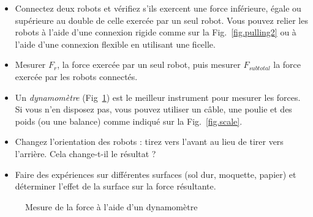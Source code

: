 \begin{framed}
\begin{itemize}
\item Connectez deux robots et vérifiez s'ils exercent une force inférieure, égale ou supérieure au double de celle exercée par un seul robot. Vous pouvez relier les robots à l'aide d'une connexion rigide comme sur la Fig.~\ref{fig.pulling2} ou à l'aide d'une connexion flexible en utilisant une ficelle.
\item Mesurer $F_r$, la force exercée par un seul robot, puis mesurer $F_{sub{total}}$ la force exercée par les robots connectés.
\item Un \emph{dynamomètre} (Fig~\ref{fig.dyna}) est le meilleur instrument pour mesurer les forces. Si vous n'en disposez pas, vous pouvez utiliser un câble, une poulie et des poids (ou une balance) comme indiqué sur la Fig.~\ref{fig.scale}.
\item Changez l'orientation des robots : tirez vers l'avant au lieu de tirer vers l'arrière. Cela change-t-il le résultat ?
\item Faire des expériences sur différentes surfaces (sol dur, moquette, papier) et déterminer l'effet de la surface sur la force résultante.
\end{itemize}
\end{framed}

\begin{figure}
\begin{center}
\caption{Mesure de la force à l'aide d'un dynamomètre}\label{fig.dyna}
\end{center}
\end{figure}

